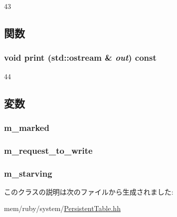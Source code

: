 \begin{DoxyCode}
43 {}
\end{DoxyCode}


\subsection{関数}
\hypertarget{classPersistentTableEntry_ac55fe386a101fbae38c716067c9966a0}{
\subsubsection[{print}]{\setlength{\rightskip}{0pt plus 5cm}void print (std::ostream \& {\em out}) const}}
\label{classPersistentTableEntry_ac55fe386a101fbae38c716067c9966a0}



\begin{DoxyCode}
44 {}
\end{DoxyCode}


\subsection{変数}
\hypertarget{classPersistentTableEntry_a3b7db11cf59baf77d617f3daa2973aa9}{
\subsubsection[{m\_\-marked}]{ {\bf m\_\-marked}}}
\label{classPersistentTableEntry_a3b7db11cf59baf77d617f3daa2973aa9}
\hypertarget{classPersistentTableEntry_ac1f16018ee9ebca87c4b1eed2b8cd0ee}{
\subsubsection[{m\_\-request\_\-to\_\-write}]{ {\bf m\_\-request\_\-to\_\-write}}}
\label{classPersistentTableEntry_ac1f16018ee9ebca87c4b1eed2b8cd0ee}
\hypertarget{classPersistentTableEntry_a1365c21e7b3cf76bed4ec5a61d5298b0}{
\subsubsection[{m\_\-starving}]{ {\bf m\_\-starving}}}
\label{classPersistentTableEntry_a1365c21e7b3cf76bed4ec5a61d5298b0}


このクラスの説明は次のファイルから生成されました:\begin{DoxyCompactItemize}
\item 
mem/ruby/system/\hyperlink{PersistentTable_8hh}{PersistentTable.hh}\end{DoxyCompactItemize}
